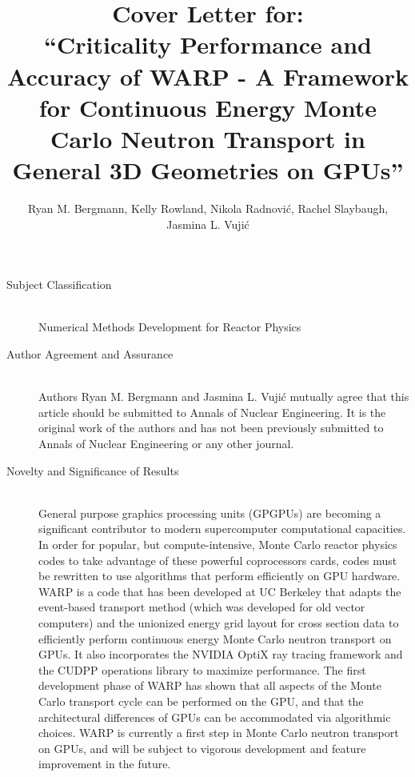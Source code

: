 \documentclass{article}
\begin{document}


\title{Cover Letter for: \\ ``Criticality Performance and Accuracy of WARP - A Framework for Continuous Energy Monte Carlo Neutron Transport in General 3D Geometries on GPUs''}
\author{Ryan M. Bergmann, Kelly Rowland, Nikola Radnovi\'c, Rachel Slaybaugh, Jasmina L. Vuji\'c}
\maketitle

\begin{description}
\item[Subject Classification] \hfill
\\
Numerical Methods Development for Reactor Physics

\item[Author Agreement and Assurance] \hfill
\\
Authors Ryan M. Bergmann and Jasmina L. Vuji\'c mutually agree that this article should be submitted to Annals of Nuclear Engineering.  It is the original work of the authors and has not been previously submitted to Annals of Nuclear Engineering or any other journal.

\item[Novelty and Significance of Results] \hfill
\\
General purpose graphics processing units (GPGPUs) are becoming a significant contributor to modern supercomputer computational capacities.  In order for popular, but compute-intensive, Monte Carlo reactor physics codes to take advantage of these powerful coprocessors cards, codes must be rewritten to use algorithms that perform efficiently on GPU hardware.  WARP is a code that has been developed at UC Berkeley that adapts the event-based transport method (which was developed for old vector computers) and the unionized energy grid layout for cross section data to efficiently perform continuous energy Monte Carlo neutron transport on GPUs.  It also incorporates the NVIDIA OptiX ray tracing framework and the CUDPP operations library to maximize performance.   The first development phase of WARP has shown that all aspects of the Monte Carlo transport cycle can be performed on the GPU, and that the architectural differences of GPUs can be accommodated via algorithmic choices.  WARP is currently a first step in Monte Carlo neutron transport on GPUs, and will be subject to vigorous development and feature improvement in the future.  

\end{description}
\end{document}
